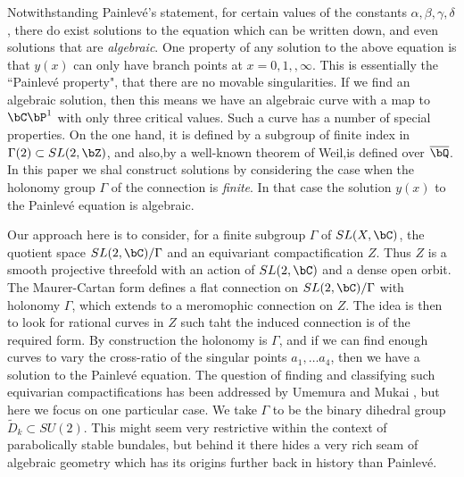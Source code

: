 Notwithstanding Painlev\'e's statement, for certain values of the constants $\alpha, \beta, \gamma, \delta$, there do exist solutions to the equation which can be written down, and even solutions that are \textit{algebraic}. One property of any solution to the above equation is that $y(x)$ can only have branch points at $x = 0,1,, \infty$. This is essentially the ``Painlev\'e property", that there are no movable singularities. If we find an algebraic solution, then this means we have an algebraic curve with a map to $\bC\bP^{1}$ with only three critical values. Such a curve has a number of special properties. On the one hand, it is defined by a subgroup of finite index in $\Gamma(2) \subset SL(2, \bZ)$, and also,by a well-known theorem of Weil,is defined over $\overline{\bQ}$. In this paper we shal construct solutions by considering the case when the holonomy group $\Gamma$ of the connection is \textit{finite}. In that case the solution $y(x)$ to the Painlev\'e equation is algebraic.

Our approach here is to consider, for a finite subgroup $\Gamma$ of $SL(X, \bC)$, the quotient space $SL(2 ,\bC)/\Gamma$ and an equivariant compactification $Z$. Thus $Z$ is a smooth projective threefold with an action of $SL(2, \bC)$ and a dense open orbit. The Maurer-Cartan form defines a flat connection on $SL(2, \bC)/\Gamma$ with holonomy $\Gamma$, which extends to a meromophic connection on $Z$. The idea is then to look for rational curves in $Z$ such taht the induced connection is of the required form. By construction the holonomy is $\Gamma$, and if we can find enough curves to vary the cross-ratio of the singular points $a_{1}, \ldots a_{4}$, then we have a solution to the Painlev\'e equation. The question of finding and classifying such equivarian compactifications has been addressed by Umemura and Mukai \cite{art7-key12}, but here we focus on one particular case. We take $\Gamma$ to be the binary dihedral group $\tilde{D}_{k} \subset SU(2)$. This might seem very restrictive within the context of parabolically stable bundales, but behind it there hides a very rich seam of algebraic geometry which has its origins further back in history than Painlev\'e.


